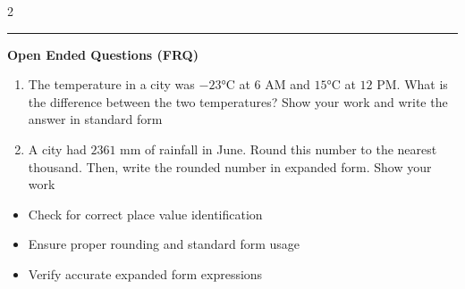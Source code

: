 \documentclass[10pt]{article}
\begin{document}
\begin{multicols}{2}
\begin{enumerate}[label=\textbf{Q\arabic*.}, leftmargin=*, itemsep=6pt, parsep=0pt]
\end{enumerate}
\end{multicols}

\vspace{-0.2cm}
\hrule
\vspace{0.2cm}
\textbf{\small Open Ended Questions (FRQ)}
\begin{enumerate}[label=\textbf{Q\arabic*.}, start=9, itemsep=5pt, topsep=0pt]

  \item \small The temperature in a city was $-23$°C at $6$ AM and $15$°C at $12$ PM. What is the difference between the two temperatures? Show your work and write the answer in standard form \vspace{2cm}

  \item \small A city had $2361$ mm of rainfall in June. Round this number to the nearest thousand. Then, write the rounded number in expanded form. Show your work \vspace{2cm}

\end{enumerate}

\vfill

\begin{tcolorbox}[colback=blue!5, colframe=mainblue!50, title=\small \textbf{Chef's Tips}, fonttitle=\bfseries, bottom=1mm]
\begin{itemize}[noitemsep, topsep=2pt, leftmargin=0.5cm]
  \item \scriptsize Check for correct place value identification\item \scriptsize Ensure proper rounding and standard form usage\item \scriptsize Verify accurate expanded form expressions
\end{itemize}
\end{tcolorbox}
\end{document}
